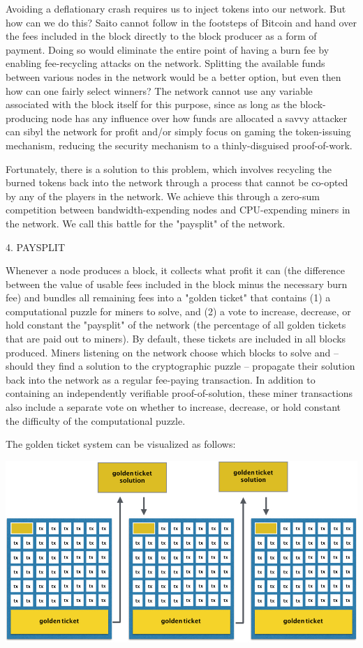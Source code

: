 \documentclass[11.5pt, oneside]{article}   	%
\begin{document}
\begin{multicols}{2}
Avoiding a deflationary crash requires us to inject tokens into our network. But how can we do this? Saito cannot follow in the footsteps of Bitcoin and hand over the fees included in the block directly to the block producer as a form of payment. Doing so would eliminate the entire point of having a burn fee by enabling fee-recycling attacks on the network. Splitting the available funds between various nodes in the network would be a better option, but even then how can one fairly select winners? The network cannot use any variable associated with the block itself for this purpose, since as long as the block-producing node has any influence over how funds are allocated a savvy attacker can sibyl the network for profit and/or simply focus on gaming the token-issuing mechanism, reducing the security mechanism to a thinly-disguised proof-of-work.

Fortunately, there is a solution to this problem, which involves recycling the burned tokens back into the network through a process that cannot be co-opted by any of the players in the network. We achieve this through a zero-sum competition between bandwidth-expending nodes and CPU-expending miners in the network. We call this battle for the "paysplit" of the network.

4. PAYSPLIT

Whenever a node produces a block, it collects what profit it can (the difference between the value of usable fees included in the block minus the necessary burn fee) and bundles all remaining fees into a "golden ticket" that contains (1) a computational puzzle for miners to solve, and (2) a vote to increase, decrease, or hold constant the "paysplit" of the network (the percentage of all golden tickets that are paid out to miners). By default, these tickets are included in all blocks produced. Miners listening on the network choose which blocks to solve and -- should they find a solution to the cryptographic puzzle -- propagate their solution back into the network as a regular fee-paying transaction. In addition to containing an independently verifiable proof-of-solution, these miner transactions also include a separate vote on whether to increase, decrease, or hold constant the difficulty of the computational puzzle.

The golden ticket system can be visualized as follows:

\includegraphics[width=.45\textwidth]{saito7.jpeg}


\end{multicols}
\end{document}
